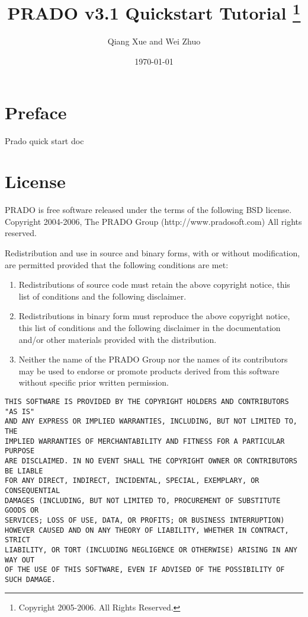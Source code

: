 \documentclass{book}
\title{\Huge \bfseries PRADO v3.1 Quickstart Tutorial
    \thanks{Copyright 2005-2006. All Rights Reserved.}
}
\author{Qiang Xue and Wei Zhuo}
\date{\today}
\begin{document}
\maketitle

\pagestyle{plain}
\tableofcontents

\chapter*{Preface}
Prado quick start doc

\chapter*{License}
PRADO is free software released under the terms of the following BSD license.\\
Copyright 2004-2006, The PRADO Group (http://www.pradosoft.com)
All rights reserved.

Redistribution and use in source and binary forms, with or without
modification, are permitted provided that the following conditions are met:
\begin{enumerate}
	\item Redistributions of source code must retain the above copyright notice,
this list of conditions and the following disclaimer.

 \item Redistributions in binary form must reproduce the above copyright notice,
this list of conditions and the following disclaimer in the documentation
and/or other materials provided with the distribution.

\item Neither the name of the PRADO Group nor the names of its contributors may
be used to endorse or promote products derived from this software without
specific prior written permission.
\end{enumerate}

\begin{verbatim}
THIS SOFTWARE IS PROVIDED BY THE COPYRIGHT HOLDERS AND CONTRIBUTORS "AS IS"
AND ANY EXPRESS OR IMPLIED WARRANTIES, INCLUDING, BUT NOT LIMITED TO, THE
IMPLIED WARRANTIES OF MERCHANTABILITY AND FITNESS FOR A PARTICULAR PURPOSE
ARE DISCLAIMED. IN NO EVENT SHALL THE COPYRIGHT OWNER OR CONTRIBUTORS BE LIABLE
FOR ANY DIRECT, INDIRECT, INCIDENTAL, SPECIAL, EXEMPLARY, OR CONSEQUENTIAL
DAMAGES (INCLUDING, BUT NOT LIMITED TO, PROCUREMENT OF SUBSTITUTE GOODS OR
SERVICES; LOSS OF USE, DATA, OR PROFITS; OR BUSINESS INTERRUPTION)
HOWEVER CAUSED AND ON ANY THEORY OF LIABILITY, WHETHER IN CONTRACT, STRICT
LIABILITY, OR TORT (INCLUDING NEGLIGENCE OR OTHERWISE) ARISING IN ANY WAY OUT
OF THE USE OF THIS SOFTWARE, EVEN IF ADVISED OF THE POSSIBILITY OF SUCH DAMAGE.
\end{verbatim}
\end{document}
